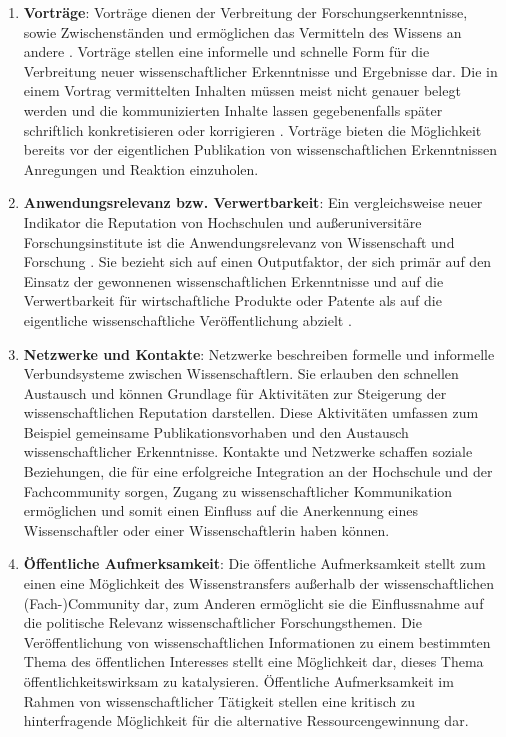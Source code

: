 \begin{enumerate}
\item \textbf{Vorträge}: Vorträge dienen der Verbreitung der Forschungserkenntnisse, sowie Zwischenständen und ermöglichen das Vermitteln des Wissens an andere \cite{rassenhoevel_2010_performancemessung}. Vorträge stellen eine informelle und schnelle Form für die Verbreitung neuer wissenschaftlicher Erkenntnisse und Ergebnisse dar. Die in einem Vortrag vermittelten Inhalten müssen meist nicht genauer belegt werden und die kommunizierten Inhalte lassen gegebenenfalls später schriftlich konkretisieren oder korrigieren \cite{haberle_2002_jahrbuch}. Vorträge bieten die Möglichkeit bereits vor der eigentlichen Publikation von wissenschaftlichen Erkenntnissen Anregungen und Reaktion einzuholen.
\item\textbf{Anwendungsrelevanz bzw. Verwertbarkeit}: Ein vergleichsweise neuer Indikator die Reputation von Hochschulen und außeruniversitäre Forschungsinstitute ist die Anwendungsrelevanz von Wissenschaft und Forschung \cite{simon_2009_wissenschaft_governance}. Sie bezieht sich auf einen Outputfaktor, der sich primär auf den Einsatz der gewonnenen wissenschaftlichen Erkenntnisse und auf die Verwertbarkeit für wirtschaftliche Produkte oder Patente als auf die eigentliche wissenschaftliche Veröffentlichung abzielt \cite{suchen}.
\item \textbf{Netzwerke und Kontakte}: Netzwerke beschreiben formelle und informelle Verbundsysteme zwischen Wissenschaftlern. Sie erlauben den schnellen Austausch und können Grundlage für Aktivitäten zur Steigerung der wissenschaftlichen Reputation darstellen. Diese Aktivitäten umfassen zum Beispiel gemeinsame Publikationsvorhaben und den Austausch wissenschaftlicher Erkenntnisse. Kontakte und Netzwerke schaffen soziale Beziehungen, die für eine erfolgreiche Integration an der Hochschule und der Fachcommunity sorgen, Zugang zu wissenschaftlicher Kommunikation ermöglichen und somit einen Einfluss auf die Anerkennung eines Wissenschaftler oder einer Wissenschaftlerin haben können.
\item \textbf{Öffentliche Aufmerksamkeit}: Die öffentliche Aufmerksamkeit stellt zum einen eine Möglichkeit des Wissenstransfers außerhalb der wissenschaftlichen (Fach-)Community dar, zum Anderen ermöglicht sie die Einflussnahme auf die politische Relevanz wissenschaftlicher Forschungsthemen. Die Veröffentlichung von wissenschaftlichen Informationen zu einem bestimmten Thema des öffentlichen Interesses stellt eine Möglichkeit dar, dieses Thema öffentlichkeitswirksam zu katalysieren. Öffentliche Aufmerksamkeit im Rahmen von wissenschaftlicher Tätigkeit stellen eine kritisch zu hinterfragende Möglichkeit für die alternative Ressourcengewinnung dar. \cite{suche}

\end{enumerate}
